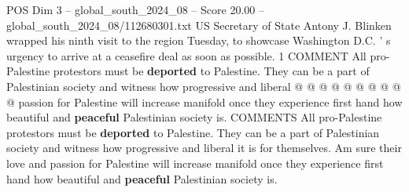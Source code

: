 \begin{textsample}{POS Dim 3 – global\_south\_2024\_08 – Score 20.00 – global\_south\_2024\_08/112680301.txt}
US Secretary of State Antony J.
Blinken wrapped his ninth visit to the region Tuesday, to showcase Washington D.C. ' s urgency to arrive at a ceasefire deal as soon as possible. 1 COMMENT All pro-Palestine protestors must be \textbf{deported} to Palestine.
They can be a part of Palestinian society and witness how progressive and liberal @ @ @ @ @ @ @ @ @ @ passion for Palestine will increase manifold once they experience first hand how beautiful and \textbf{peaceful} Palestinian society is.
COMMENTS All pro-Palestine protestors must be \textbf{deported} to Palestine.
They can be a part of Palestinian society and witness how progressive and liberal it is for themselves.
Am sure their love and passion for Palestine will increase manifold once they experience first hand how beautiful and \textbf{peaceful} Palestinian society is.

\end{textsample}
